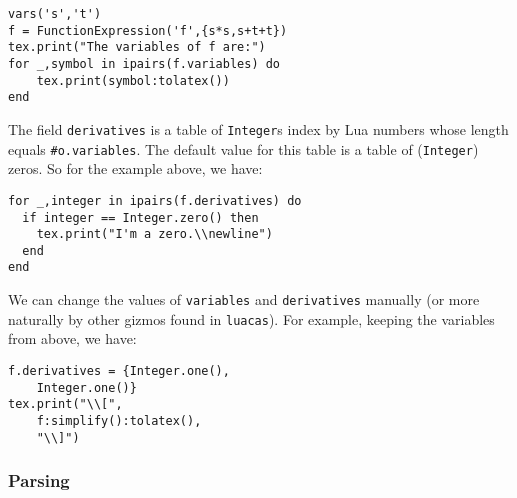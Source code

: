 \documentclass{article}
\begin{document}
\begin{codebox}
    \begin{verbatim}
vars('s','t')
f = FunctionExpression('f',{s*s,s+t+t})
tex.print("The variables of f are:")
for _,symbol in ipairs(f.variables) do 
    tex.print(symbol:tolatex())
end
    \end{verbatim}
    \tcblower
{}
\end{codebox}
The field \texttt{derivatives} is a table of \texttt{Integer}s index by Lua numbers whose length equals \texttt{#o.variables}. The default value for this table is a table of (\texttt{Integer}) zeros. So for the example above, we have:
\begin{codebox}
    \begin{verbatim}
for _,integer in ipairs(f.derivatives) do 
  if integer == Integer.zero() then
    tex.print("I'm a zero.\\newline")
  end
end
\end{verbatim}
\tcblower
{}
\end{codebox}
We can change the values of \texttt{variables} and \texttt{derivatives} manually (or more naturally by other gizmos found in \texttt{luacas}). For example, keeping the variables from above, we have:
\begin{codebox}
    \begin{verbatim}
f.derivatives = {Integer.one(),
    Integer.one()}
tex.print("\\[",
    f:simplify():tolatex(),
    "\\]")
\end{verbatim}
\tcblower
{}
\end{codebox}

\subsubsection*{Parsing}
\end{document}
